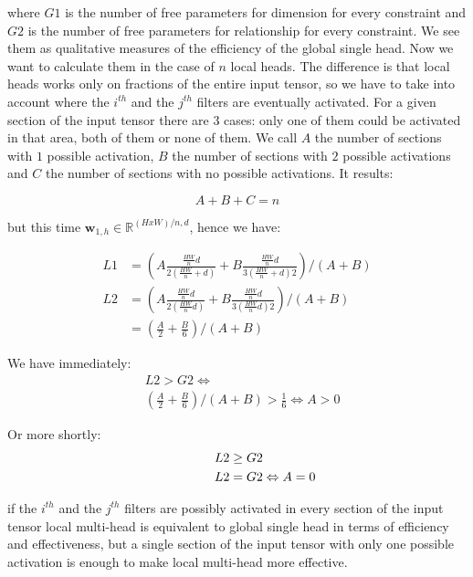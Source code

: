 \documentclass[fleqn,10pt]{SelfArx}
\begin{document}
where $G1$ is the number of free parameters for dimension for every constraint and $G2$ is the number of free parameters for relationship for every constraint. We see them as qualitative measures of the efficiency of the global single head.
Now we want to calculate them in the case of $n$ local heads. The difference is that local heads works only on fractions of the entire input tensor, so we have to take into account where the $i^{th}$ and the $j^{th}$ filters are eventually activated. For a given section of the input tensor there are $3$ cases: only one of them could be activated in that area, both of them or none of them. We call $A$ the number of sections with $1$ possible activation, $B$ the number of sections with $2$ possible activations and $C$ the number of sections with no possible activations. It results:

$$ A + B + C = n $$

but this time $\mathbf{w}_{1,h} \in \mathbb{R}^{(HxW)/n, d}$, hence we have:

\begin{align}
             L1 &= \left(A\frac{\frac{HW}{n}d}{2(\frac{HW}{n} + d)} +  B\frac{\frac{HW}{n}d}{3(\frac{HW}{n} + d)2}\right)/(A + B)\\
             L2 &= \left(A\frac{\frac{HW}{n}d}{2(\frac{HW}{n}d)} +  B\frac{\frac{HW}{n}d}{3(\frac{HW}{n}d)2}\right)/(A + B) \nonumber \\
                 &= \left(\frac{A}{2} +  \frac{B}{6}\right)/(A + B)
\end{align}

We have immediately:
\begin{align}
             & L2 > G2 \Leftrightarrow \nonumber\\
             & \left(\frac{A}{2} +  \frac{B}{6}\right)/(A + B) > \frac{1}{6} \Leftrightarrow A > 0 \nonumber                 
\end{align}

Or more shortly: 
\begin{align}
             & \hspace{1.55cm} L2 \geq G2\\
             & \hspace{1.55cm} L2 = G2 \Leftrightarrow A = 0                
\end{align}

if the $i^{th}$ and the $j^{th}$ filters are possibly activated in every section of the input tensor local multi-head is equivalent to global single head in terms of efficiency and effectiveness, but a single section of the input tensor with only one possible activation is enough to make local multi-head more effective.
\end{document}
